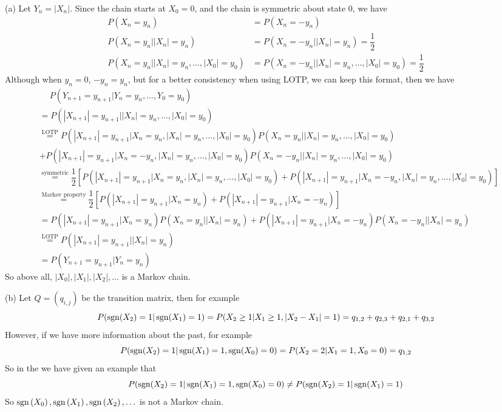 \begin{homeworkProblem}
(a) Let $Y_n=\left|X_n\right|$. Since the chain starts at $X_0=0$, and the chain is symmetric about state $0$, we have
\begin{align*}
P(X_n=y_n) &= P(X_n=-y_n) \\
P(X_n=y_n|\left|X_n\right|=y_n) &= P(X_n=-y_n|\left|X_n\right|=y_n) = \dfrac{1}{2} \\
P(X_n=y_n|\left|X_n\right|=y_n,\ldots,\left|X_0\right|=y_0) &= P(X_n=-y_n|\left|X_n\right|=y_n,\ldots,\left|X_0\right|=y_0) = \dfrac{1}{2}
\end{align*}
Although when $y_n=0$, $-y_n=y_n$, but for a better consistency when using LOTP, we can keep this format, then we have
\begin{align*}
&\quad\ P(Y_{n+1}=y_{n+1}|Y_n=y_n,\ldots,Y_0=y_0) \\
&= P(|X_{n+1}|=y_{n+1}|\left|X_n\right|=y_n,\ldots,\left|X_0\right|=y_0) \\
&\stackrel{\text{LOTP}}{=} P(\left|X_{n+1}\right|=y_{n+1}|X_n=y_n, \left|X_n\right|=y_n,\ldots,\left|X_0\right|=y_0)P(X_n=y_n|\left|X_n\right|=y_n,\ldots,\left|X_0\right|=y_0) \\
&+ P(\left|X_{n+1}\right|=y_{n+1}|X_n=-y_n, \left|X_n\right|=y_n,\ldots,\left|X_0\right|=y_0)P(X_n=-y_n|\left|X_n\right|=y_n,\ldots,\left|X_0\right|=y_0) \\
&\stackrel{\text{symmetric}}{=} \dfrac{1}{2}\left[P(\left|X_{n+1}\right|=y_{n+1}|X_n=y_n, \left|X_n\right|=y_n,\ldots,\left|X_0\right|=y_0)+P(\left|X_{n+1}\right|=y_{n+1}|X_n=-y_n, \left|X_n\right|=y_n,\ldots,\left|X_0\right|=y_0)\right] \\
&\stackrel{\text{Markov property}}{=} \dfrac{1}{2}\left[P(\left|X_{n+1}\right|=y_{n+1}|X_n=y_n)+P(\left|X_{n+1}\right|=y_{n+1}|X_n=-y_n)\right] \\
&= P(\left|X_{n+1}\right|=y_{n+1}|X_n=y_n)P(X_n=y_n|\left|X_n\right|=y_n) + P(\left|X_{n+1}\right|=y_{n+1}|X_n=-y_n)P(X_n=-y_n|\left|X_n\right|=y_n) \\
&\stackrel{\text{LOTP}}{=} P(\left|X_{n+1}\right|=y_{n+1}|\left|X_n\right|=y_n) \\
&= P(Y_{n+1}=y_{n+1}|Y_n=y_n)
\end{align*}
So above all, $\left|X_0\right|,\left|X_1\right|,\left|X_2\right|, \ldots$ is a Markov chain.

(b) Let $Q=(q_{i,j})$ be the transition matrix, then for example
$$P(\operatorname{sgn}(X_{2})=1|\operatorname{sgn}(X_1)=1)=P(X_2\geq 1|X_1\geq 1,|X_2-X_1|=1)=q_{1,2}+q_{2,3}+q_{2,1}+q_{3,2}$$
However, if we have more information about the past, for example
$$P(\operatorname{sgn}(X_{2})=1|\operatorname{sgn}(X_1)=1,\operatorname{sgn}(X_0)=0)=P(X_2=2|X_1=1,X_0=0)=q_{1,2}$$
So in the we have given an example that
$$P(\operatorname{sgn}(X_{2})=1|\operatorname{sgn}(X_1)=1,\operatorname{sgn}(X_0)=0)\neq P(\operatorname{sgn}(X_{2})=1|\operatorname{sgn}(X_1)=1)$$
So $\operatorname{sgn}\left(X_0\right), \operatorname{sgn}\left(X_1\right), \operatorname{sgn}\left(X_2\right), \ldots$ is not a Markov chain.


\end{homeworkProblem}
